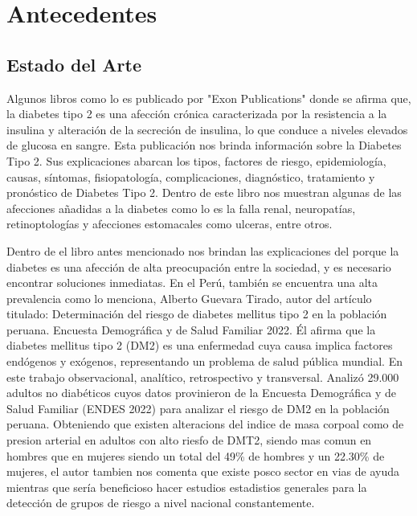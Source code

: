 \chapter{Antecedentes}
\renewcommand{\figurename}{Figura}

\section{Estado del Arte}
Algunos libros como lo es publicado por "Exon Publications" donde se afirma que, la diabetes tipo 2 es una afección crónica caracterizada por la resistencia a la insulina y alteración de la secreción de insulina, lo que conduce a niveles elevados de glucosa en sangre. Esta publicación nos brinda información sobre la Diabetes Tipo 2. Sus explicaciones abarcan los tipos, factores de riesgo, epidemiología, causas, síntomas, fisiopatología, complicaciones, diagnóstico, tratamiento y pronóstico de Diabetes Tipo 2. 
Dentro de este libro nos muestran algunas de las afecciones añadidas a la diabetes como lo es la falla renal, neuropatías, retinoptologías y afecciones estomacales como ulceras, entre otros.\cite{Publications2024}

Dentro de el libro antes mencionado nos brindan las explicaciones del porque la diabetes es una afección de alta preocupación entre la sociedad, y es necesario encontrar soluciones inmediatas. En el Perú, también se encuentra una alta prevalencia como lo menciona, Alberto Guevara Tirado, autor del artículo titulado: Determinación del riesgo de diabetes mellitus tipo 2 en la población peruana. Encuesta Demográfica y de Salud Familiar 2022. Él afirma que la diabetes mellitus tipo 2 (DM2) es una enfermedad cuya causa implica factores endógenos y exógenos, representando un problema de salud pública mundial. 
En este trabajo observacional, analítico, retrospectivo y transversal. Analizó 29.000 adultos no diabéticos cuyos datos provinieron de la Encuesta Demográfica y de Salud Familiar (ENDES 2022) para analizar el riesgo de DM2 en la población peruana. Obteniendo que existen alteracions del indice de masa corpoal como de presion arterial en adultos con alto riesfo de DMT2, siendo mas comun en hombres que en mujeres siendo un total del 49\% de hombres y un 22.30\% de mujeres, el autor tambien nos comenta que existe posco sector en vias de ayuda mientras que sería beneficioso hacer estudios estadistios generales para la detección de grupos de riesgo a nivel nacional constantemente.\cite{GuevaraTirado2024}

